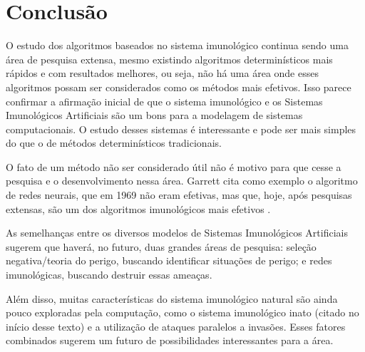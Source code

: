 \chapter{Conclusão}

O estudo dos algoritmos baseados no sistema imunológico continua sendo uma área de pesquisa extensa, mesmo existindo algoritmos determinísticos mais rápidos e com resultados melhores, ou seja, não há uma área onde esses algoritmos possam ser considerados como os métodos mais efetivos. Isso parece confirmar a afirmação inicial de que o sistema imunológico e os Sistemas Imunológicos Artificiais são um bons para a modelagem de sistemas computacionais. O estudo desses sistemas é interessante e pode ser mais simples do que o de métodos determinísticos tradicionais.

O fato de um método não ser considerado útil não é motivo para que cesse a pesquisa e o desenvolvimento nessa área. Garrett cita como exemplo o algoritmo de redes neurais, que em 1969 não eram efetivas, mas que, hoje, após pesquisas extensas, são um dos algoritmos imunológicos mais efetivos \cite{Garrett2005}.

As semelhanças entre os diversos modelos de Sistemas Imunológicos Artificiais sugerem que haverá, no futuro, duas grandes áreas de pesquisa: seleção negativa/teoria do perigo, buscando identificar situações de perigo; e redes imunológicas, buscando destruir essas ameaças.

Além disso, muitas características do sistema imunológico natural são ainda pouco exploradas pela computação, como o sistema imunológico inato (citado no início desse texto) e a utilização de ataques paralelos a invasões. Esses fatores combinados sugerem um futuro de possibilidades interessantes para a área.
